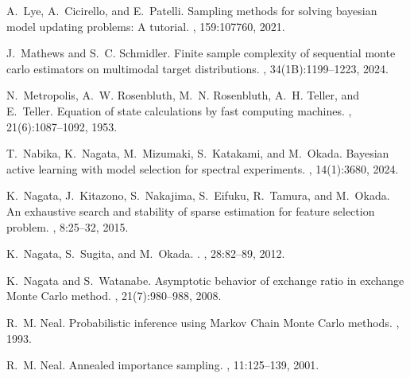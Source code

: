 \documentclass[12pt]{article}
\begin{document}
\begin{thebibliography}{10}
    A.~Lye, A.~Cicirello, and E.~Patelli.
    \newblock Sampling methods for solving bayesian model updating problems: A
      tutorial.
    , 159:107760, 2021.
    
    J.~Mathews and S.~C. Schmidler.
    \newblock Finite sample complexity of sequential monte carlo estimators on
      multimodal target distributions.
    , 34(1B):1199--1223, 2024.
    
    N.~{Metropolis}, A.~W. Rosenbluth, M.~N. Rosenbluth, A.~H. Teller, and
      E.~Teller.
    \newblock Equation of state calculations by fast computing machines.
    , 21(6):1087--1092, 1953.
    
    T.~Nabika, K.~Nagata, M.~Mizumaki, S.~Katakami, and M.~Okada.
    \newblock Bayesian active learning with model selection for spectral
      experiments.
    , 14(1):3680, 2024.
    
    K.~Nagata, J.~Kitazono, S.~Nakajima, S.~Eifuku, R.~Tamura, and M.~Okada.
    \newblock An exhaustive search and stability of sparse estimation for feature
      selection problem.
    ,
      8:25--32, 2015.
    
    K.~Nagata, S.~Sugita, and M.~Okada.
    .
    , 28:82--89, 2012.
    
    K.~Nagata and S.~Watanabe.
    \newblock Asymptotic behavior of exchange ratio in exchange {M}onte {C}arlo
      method.
    , 21(7):980--988, 2008.
    
    R.~M. Neal.
    \newblock Probabilistic inference using {M}arkov {C}hain {M}onte {C}arlo
      methods.
    , 1993.
    
    R.~M. Neal.
    \newblock Annealed importance sampling.
    , 11:125--139, 2001.
    

\end{thebibliography}
\end{document}

